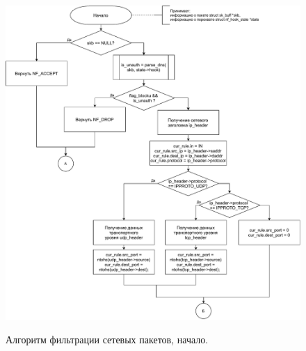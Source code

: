 \begin{figure}[h!]
	\begin{center}
		{\includegraphics[scale = 0.7]{inc/img/filter-1.pdf}}
		\caption{Алгоритм фильтрации сетевых пакетов, начало.}
		\label{img:filter-1}
	\end{center}
\end{figure}

